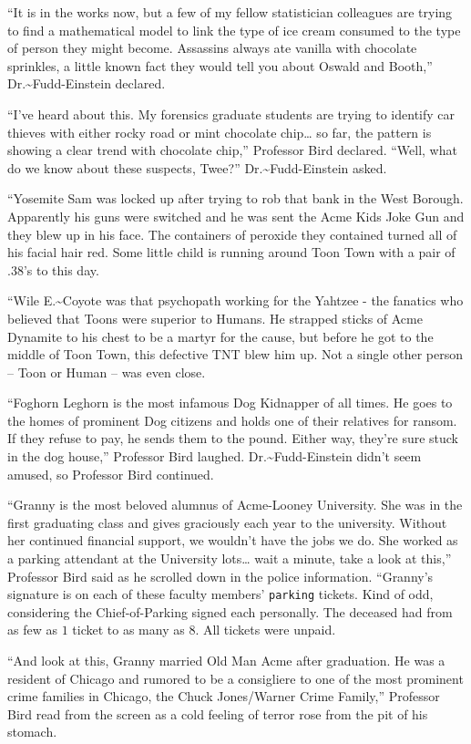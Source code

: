 \documentclass[captions=tableheading]{scrbook}
\begin{document}
“It is in the works now, but a few of my fellow statistician colleagues are trying to find a mathematical model to link the type of ice cream consumed to the type of person they might become. Assassins always ate vanilla with chocolate sprinkles, a little known fact they would tell you about Oswald and Booth,” Dr.\~{}Fudd-Einstein declared.

“I’ve heard about this. My forensics graduate students are trying to identify car thieves with either rocky road or mint chocolate chip… so far, the pattern is showing a clear trend with chocolate chip,” Professor Bird declared. 
“Well, what do we know about these suspects, Twee?” Dr.\~{}Fudd-Einstein asked.

“Yosemite Sam was locked up after trying to rob that bank in the West Borough. Apparently his guns were switched and he was sent the Acme Kids Joke Gun and they blew up in his face. The containers of peroxide they contained turned all of his facial hair red. Some little child is running around Toon Town with a pair of .38’s to this day. 

“Wile E.\~{}Coyote was that psychopath working for the Yahtzee - the fanatics who believed that Toons were superior to Humans. He strapped sticks of Acme Dynamite to his chest to be a martyr for the cause, but before he got to the middle of Toon Town, this defective TNT blew him up. Not a single other person -- Toon or Human -- was even close.

“Foghorn Leghorn is the most infamous Dog Kidnapper of all times. He goes to the homes of prominent Dog citizens and holds one of their relatives for ransom. If they refuse to pay, he sends them to the pound. Either way, they’re sure stuck in the dog house,” Professor Bird laughed. Dr.\~{}Fudd-Einstein didn’t seem amused, so Professor Bird continued. 

“Granny is the most beloved alumnus of Acme-Looney University. She was in the first graduating class and gives graciously each year to the university. Without her continued financial support, we wouldn’t have the jobs we do. She worked as a parking attendant at the University lots\ldots{} wait a minute, take a look at this,” Professor Bird said as he scrolled down in the police information. “Granny’s signature is on each of these faculty members’ \texttt{parking} tickets. Kind of odd, considering the Chief-of-Parking signed each personally. The deceased had from as few as \(  1 \) ticket to as many as \(  8 \). All tickets were unpaid.

“And look at this, Granny married Old Man Acme after graduation. He was a resident of Chicago and rumored to be a consigliere to one of the most prominent crime families in Chicago, the Chuck Jones/Warner Crime Family,” Professor Bird read from the screen as a cold feeling of terror rose from the pit of his stomach. 
\end{document}
